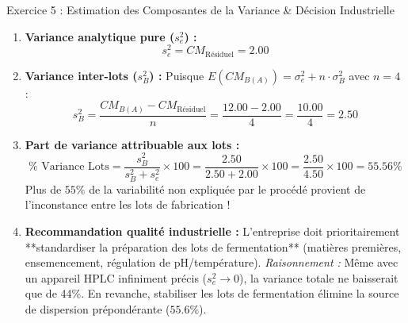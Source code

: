 \documentclass[11pt,a4paper]{article}
\begin{document}
\begin{solutionbox}{Exercice 5 : Estimation des Composantes de la Variance \& Décision Industrielle}
\begin{enumerate}[label=\textbf{\alph*.}]
  \item \textbf{Variance analytique pure ($s_e^2$) :}
  \begin{equation*}
    s_e^2 = CM_{\text{Résiduel}} = \mathbf{2.00}
  \end{equation*}

  \item \textbf{Variance inter-lots ($s_B^2$) :}
  Puisque $E(CM_{B(A)}) = \sigma_e^2 + n \cdot \sigma_B^2$ avec $n = 4$ :
  \begin{equation*}
    s_B^2 = \frac{CM_{B(A)} - CM_{\text{Résiduel}}}{n} = \frac{12.00 - 2.00}{4} = \frac{10.00}{4} = \mathbf{2.50}
  \end{equation*}

  \item \textbf{Part de variance attribuable aux lots :}
  \begin{equation*}
    \% \text{ Variance Lots} = \frac{s_B^2}{s_B^2 + s_e^2} \times 100 = \frac{2.50}{2.50 + 2.00} \times 100 = \frac{2.50}{4.50} \times 100 = \mathbf{55.56\%}
  \end{equation*}
  Plus de $55\%$ de la variabilité non expliquée par le procédé provient de l'inconstance entre les lots de fabrication !

  \item \textbf{Recommandation qualité industrielle :}
  L'entreprise doit prioritairement **standardiser la préparation des lots de fermentation** (matières premières, ensemencement, régulation de pH/température).
  \textit{Raisonnement :} Même avec un appareil HPLC infiniment précis ($s_e^2 \to 0$), la variance totale ne baisserait que de 44\%. En revanche, stabiliser les lots de fermentation élimine la source de dispersion prépondérante ($55.6\%$).
\end{enumerate}
\end{solutionbox}
\end{document}
